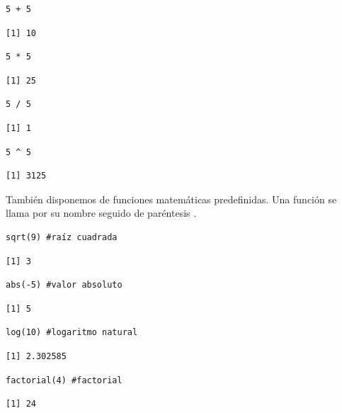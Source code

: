 \documentclass[8pt]{beamer}
\begin{document}
\begin{frame}[fragile]
\begin{lstlisting}[style=RScript]
5 + 5	
\end{lstlisting}
\begin{lstlisting}[style=RConsole]
[1] 10
\end{lstlisting}
\begin{lstlisting}[style=RScript]
5 * 5
\end{lstlisting}
\begin{lstlisting}[style=RConsole]
[1] 25	
\end{lstlisting}
\begin{lstlisting}[style=RScript]
5 / 5	
\end{lstlisting}
\begin{lstlisting}[style=RConsole]
[1] 1
\end{lstlisting}
\begin{lstlisting}[style=RScript]
5 ^ 5	
\end{lstlisting}
\begin{lstlisting}[style=RConsole]
[1] 3125	
\end{lstlisting}
\end{frame}









\begin{frame}[fragile]
	También disponemos de funciones matemáticas predefinidas. Una función se llama por su nombre seguido de paréntesis .
	
\begin{lstlisting}[style=RScript]
sqrt(9) #raíz cuadrada
\end{lstlisting}
\begin{lstlisting}[style=RConsole]
[1] 3
\end{lstlisting}
\begin{lstlisting}[style=RScript]
abs(-5) #valor absoluto
\end{lstlisting}
\begin{lstlisting}[style=RConsole]
[1] 5
\end{lstlisting}
\begin{lstlisting}[style=RScript]
log(10) #logaritmo natural
\end{lstlisting}
\begin{lstlisting}[style=RConsole]
[1] 2.302585
\end{lstlisting}
\begin{lstlisting}[style=RScript]
factorial(4) #factorial
\end{lstlisting}
\begin{lstlisting}[style=RConsole]
[1] 24
\end{lstlisting}
\end{frame}
\end{document}
